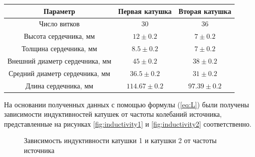 \documentclass[a4paper, 12pt]{article}
\begin{document}
\begin{center}
\begin{tabular}{|c|c|c|}
	\hline 
	Параметр & Первая катушка & Вторая катушка \\ 
	\hline 
	Число витков & 30  & 36 \\ 
	\hline 
	Высота сердечника, мм & $12 \pm 0.2$ & $7 \pm 0.2$ \\ 
	\hline 
	Толщина сердечника, мм & $8.5\pm 0.2$ & $7 \pm 0.2$\\ 
	\hline 
	Внешний диаметр сердечника, мм & $45 \pm 0.2$ & $38 \pm 0.2$ \\ 
	\hline 
	Средний диаметр сердечника, мм & $36.5 \pm 0.2$ & $31 \pm 0.2$ \\ 
	\hline 
	Длина сердечника, мм & $114.67 \pm 0.2$ & $97.39 \pm 0.2$ \\ 
	\hline 
\end{tabular} 
	
\end{center}

\medspace

На основании полученных данных с помощью формулы (\ref{eq:L}) были получены зависимости индуктивностей катушек от частоты колебаний источника, представленные на рисунках \ref{fig:inductivity1} и \ref{fig:inductivity2} соответственно.

\begin{figure}[H]
	\centering
	\caption{Зависимость индуктивности катушки 1  и катушки 2  от частоты источника}
\end{figure}
\end{document}
